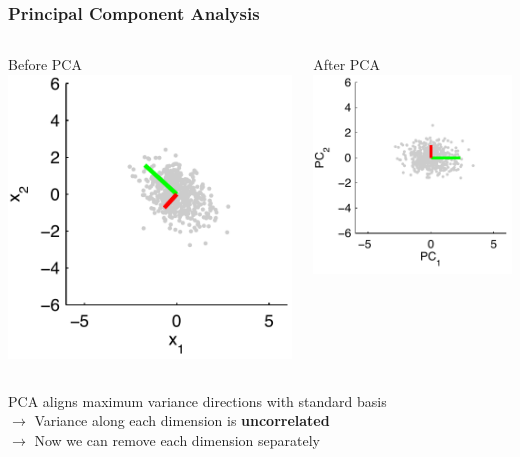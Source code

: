 \documentclass[Nike]{tuberlinbeamer}
\begin{document}
\begin{frame}\frametitle{Principal Component Analysis}
\begin{columns}
\centering
Before PCA
\includegraphics[width=.8\textwidth]{PCA_toy_before}

\pause
\centering
After PCA
\includegraphics[width=.8\textwidth]{PCA_toy_after}
\end{columns}
\centering

\pause
PCA aligns maximum variance directions with standard basis\\
$\rightarrow$ Variance along each dimension is {\bf uncorrelated}\\
$\rightarrow$ Now we can remove each dimension separately\\
\end{frame}
\end{document}
